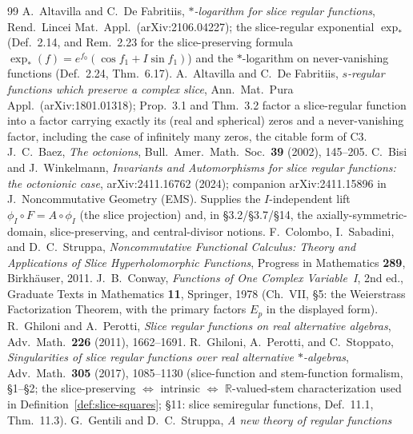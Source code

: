 \documentclass[11pt]{article}
\newcommand{\RR}{\mathbb{R}}
\theoremstyle{plain}
\theoremstyle{definition}
\theoremstyle{remark}
\begin{document}
\begin{thebibliography}{99}
 A.~Altavilla and C.~De Fabritiis, \emph{$\ast$-logarithm for slice regular
functions}, Rend.\ Lincei Mat.\ Appl.\ (arXiv:2106.04227); the slice-regular exponential
$\exp_{*}$ (Def.~2.14, and Rem.~2.23 for the slice-preserving formula
$\exp_{*}(f)=e^{f_0}(\cos f_1+I\sin f_1)$) and the $\ast$-logarithm on never-vanishing
functions (Def.~2.24, Thm.~6.17).
 A.~Altavilla and C.~De Fabritiis, \emph{$s$-regular functions which
preserve a complex slice}, Ann.\ Mat.\ Pura Appl.\ (arXiv:1801.01318); Prop.~3.1 and
Thm.~3.2 factor a slice-regular function into a factor carrying exactly its (real and
spherical) zeros and a never-vanishing factor, including the case of infinitely many zeros,
the citable form of C3.
 J.~C.~Baez, \emph{The octonions}, Bull.\ Amer.\ Math.\ Soc.\
\textbf{39} (2002), 145--205.
 C.~Bisi and J.~Winkelmann, \emph{Invariants and Automorphisms for slice
regular functions: the octonionic case}, arXiv:2411.16762 (2024); companion arXiv:2411.15896 in
J.~Noncommutative Geometry (EMS). Supplies the $I$-independent lift $\phi_I\circ F=A\circ\phi_I$
(the slice projection) and, in \S3.2/\S3.7/\S14, the axially-symmetric-domain, slice-preserving, and
central-divisor notions.
 F.~Colombo, I.~Sabadini, and D.~C.~Struppa, \emph{Noncommutative
Functional Calculus: Theory and Applications of Slice Hyperholomorphic Functions},
Progress in Mathematics \textbf{289}, Birkh\"auser, 2011.
 J.~B.~Conway, \emph{Functions of One Complex
Variable~I}, 2nd ed., Graduate Texts in Mathematics \textbf{11},
Springer, 1978 (Ch.~VII, \S5: the Weierstrass Factorization Theorem, with
the primary factors $E_p$ in the displayed form).
 R.~Ghiloni and A.~Perotti, \emph{Slice regular functions on real
alternative algebras}, Adv.\ Math.\ \textbf{226} (2011), 1662--1691.
\bibitem{SeriesExp} R.~Ghiloni, A.~Perotti, and C.~Stoppato, \emph{Singularities of slice regular
functions over real alternative $\ast$-algebras}, Adv.\ Math.\ \textbf{305} (2017), 1085--1130
(slice-function and stem-function formalism, \S1--\S2; the slice-preserving
$\Leftrightarrow$ intrinsic $\Leftrightarrow$ $\RR$-valued-stem characterization used in
Definition~\ref{def:slice-squares}; \S11: slice semiregular functions, Def.~11.1, Thm.~11.3).
\bibitem{GS07} G.~Gentili and D.~C.~Struppa, \emph{A new theory of regular functions
}
\end{thebibliography}
\end{document}
